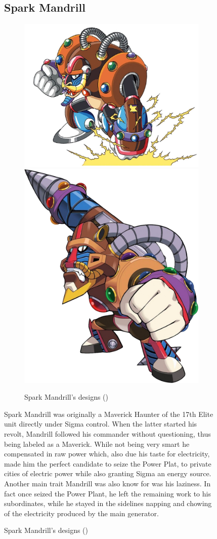 \begin{figure}[htp]
\subsection{Spark Mandrill}\label{boss:Spark_mandrill}
\begin{figure}[htp]
	\centering
	\includegraphics[width=0.5\linewidth]{figures/X1/Spark_mandrill/SparkMandrill.jpg}
	\includegraphics[width=0.4\linewidth]{figures/X1/Spark_mandrill/MHXSparkMandrill.png}
	\caption{Spark Mandrill's designs (\cite{book:MMX_Complete_art})}
\end{figure}
Spark Mandrill was originally a Maverick Haunter of the 17th Elite unit directly under Sigma control. When the latter started his revolt, Mandrill followed his commander without questioning, thus being labeled as a Maverick. While not being very smart he compensated in raw power\cite{MHX:manual} which, also due his taste for electricity, made him the perfect candidate to seize the Power Plat, to private cities of electric power while also granting Sigma an energy source. Another main trait Mandrill was also know for was his laziness. In fact once seized the Power Plant, he left the remaining work to his subordinates, while he stayed in the sidelines napping and chowing of the electricity produced by the main generator\cite{wayback:X_resources}.


\end{figure}
